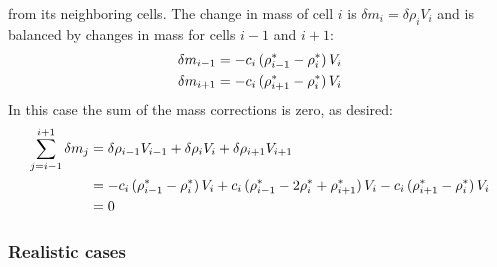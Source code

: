 from its neighboring cells.  The change in mass of cell $i$ is $\delta m_i = \delta \rho_i V_i$ and is balanced by changes in mass
for cells $i-1$ and $i+1$:
\begin{align}
\delta m_{i-1} &= - c_i \, (\rho_{i-1}^* - \rho_i^*) \, V_i \notag\\
\delta m_{i+1} &= - c_i \, (\rho_{i+1}^* - \rho_i^*) \, V_i \notag
\end{align}
In this case the sum of the mass corrections is zero, as desired:
\begin{align}
\sum_{j=i-1}^{i+1} \delta m_j &= \delta \rho_{i-1} V_{i-1} + \delta \rho_i V_i + \delta \rho_{i+1}V_{i+1} \notag\\
&= - c_i \, (\rho_{i-1}^* - \rho_i^*) \, V_i + c_i \, (\rho_{i-1}^* - 2 \rho_i^* + \rho_{i+1}^*) \, V_i - c_i \, (\rho_{i+1}^* -
\rho_i^*) \, V_i \notag\\
&= 0 \notag
\end{align}

\subsubsection*{Realistic cases}


